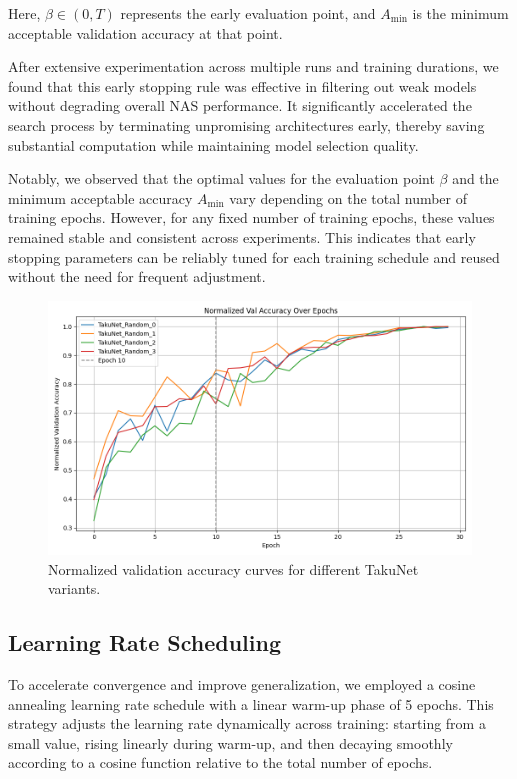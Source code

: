 Here, \( \beta \in (0,T) \) represents the early evaluation point, and \( A_{\min} \) is the minimum acceptable validation accuracy at that point.

After extensive experimentation across multiple runs and training durations, we found that this early stopping rule was effective in filtering out weak models without degrading overall NAS performance. It significantly accelerated the search process by terminating unpromising architectures early, thereby saving substantial computation while maintaining model selection quality.

Notably, we observed that the optimal values for the evaluation point \( \beta \) and the minimum acceptable accuracy \( A_{\min} \) vary depending on the total number of training epochs. However, for any fixed number of training epochs, these values remained stable and consistent across experiments. This indicates that early stopping parameters can be reliably tuned for each training schedule and reused without the need for frequent adjustment.



\begin{figure}[H]
    \centering
    \includegraphics[width=0.85\linewidth]{Pictures/val_accuracy_comparison.png}
    \caption{Normalized validation accuracy curves for different TakuNet variants.}
    \label{fig:val_accuracy}
\end{figure}




\subsection{Learning Rate Scheduling}

To accelerate convergence and improve generalization, we employed a cosine annealing learning rate schedule with a linear warm-up phase of 5 epochs. This strategy adjusts the learning rate dynamically across training: starting from a small value, rising linearly during warm-up, and then decaying smoothly according to a cosine function relative to the total number of epochs. 

